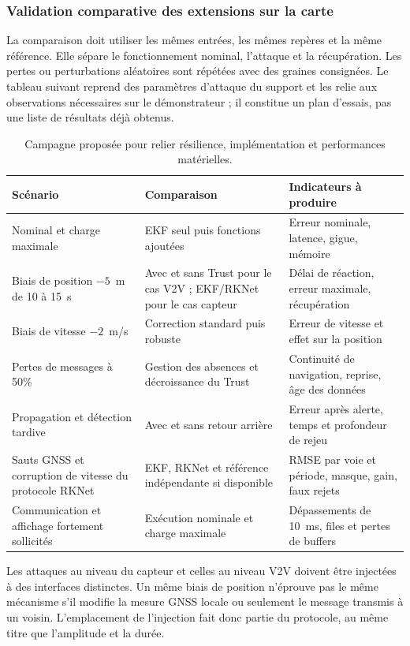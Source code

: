 \documentclass[11pt,a4paper]{article}
\begin{document}
\subsubsection{Validation comparative des extensions sur la carte}

La comparaison doit utiliser les mêmes entrées, les mêmes repères et la même référence. Elle sépare le fonctionnement nominal, l'attaque et la récupération. Les pertes ou perturbations aléatoires sont répétées avec des graines consignées. Le tableau suivant reprend des paramètres d'attaque du support et les relie aux observations nécessaires sur le démonstrateur ; il constitue un plan d'essais, pas une liste de résultats déjà obtenus.

\begin{table}[!htbp]\centering\small
\begin{tabularx}{\linewidth}{|L{4.0cm}|L{4.6cm}|Y|}\hline
{}\textbf{Scénario} & \textbf{Comparaison} & \textbf{Indicateurs à produire}\\\hline
Nominal et charge maximale & EKF seul puis fonctions ajoutées & Erreur nominale, latence, gigue, mémoire\\\hline
Biais de position $-5$~m de 10 à 15~s & Avec et sans Trust pour le cas V2V ; EKF/RKNet pour le cas capteur & Délai de réaction, erreur maximale, récupération\\\hline
Biais de vitesse $-2$~m/s & Correction standard puis robuste & Erreur de vitesse et effet sur la position\\\hline
Pertes de messages à 50\% & Gestion des absences et décroissance du Trust & Continuité de navigation, reprise, âge des données\\\hline
Propagation et détection tardive & Avec et sans retour arrière & Erreur après alerte, temps et profondeur de rejeu\\\hline
Sauts GNSS et corruption de vitesse du protocole RKNet & EKF, RKNet et référence indépendante si disponible & RMSE par voie et période, masque, gain, faux rejets\\\hline
Communication et affichage fortement sollicités & Exécution nominale et charge maximale & Dépassements de 10~ms, files et pertes de buffers\\\hline
\end{tabularx}
\caption{Campagne proposée pour relier résilience, implémentation et performances matérielles.}
\end{table}

Les attaques au niveau du capteur et celles au niveau V2V doivent être injectées à des interfaces distinctes. Un même biais de position n'éprouve pas le même mécanisme s'il modifie la mesure GNSS locale ou seulement le message transmis à un voisin. L'emplacement de l'injection fait donc partie du protocole, au même titre que l'amplitude et la durée.
\end{document}

